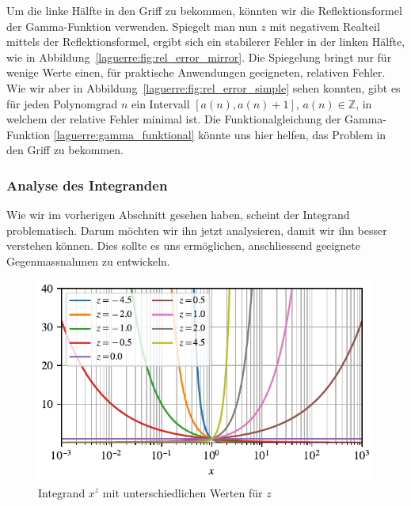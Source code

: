 Um die linke Hälfte in den Griff zu bekommen,
könnten wir die Reflektionsformel der Gamma-Funktion verwenden.
Spiegelt man nun $z$ mit negativem Realteil mittels der Reflektionsformel,
ergibt sich ein stabilerer Fehler in der linken Hälfte,
wie in Abbildung~\ref{laguerre:fig:rel_error_mirror}.
Die Spiegelung bringt nur für wenige Werte einen,
für praktische Anwendungen geeigneten,
relativen Fehler.
Wie wir aber in Abbildung~\ref{laguerre:fig:rel_error_simple} sehen konnten,
gibt es für jeden Polynomgrad $n$ ein Intervall $[a(n), a(n) + 1]$,
$a(n) \in \mathbb{Z}$,
in welchem der relative Fehler minimal ist.
Die Funktionalgleichung der Gamma-Funktion \eqref{laguerre:gamma_funktional}
könnte uns hier helfen,
das Problem in den Griff zu bekommen.

\subsubsection{Analyse des Integranden}
Wie wir im vorherigen Abschnitt gesehen haben,
scheint der Integrand problematisch.
Darum möchten wir ihn jetzt analysieren,
damit wir ihn besser verstehen können.
Dies sollte es uns ermöglichen,
anschliessend geeignete Gegenmassnahmen zu entwickeln.

\begin{figure}
\centering
% 
\includegraphics{papers/laguerre/images/integrand.pdf}
\caption{Integrand $x^z$ mit unterschiedlichen Werten für $z$}
\label{laguerre:fig:integrand}
\end{figure}

